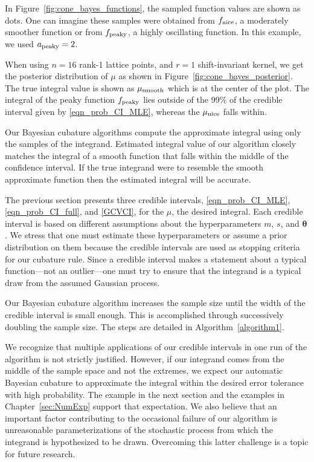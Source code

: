 \documentclass{iitthesis}          %
\newcommand{\bm}[1]{\boldsymbol{#1}}
\newcommand{\vtheta}{{\bm{\theta}}}
\newcommand{\vx}{\bm{x}}
\newcommand{\NICE}{\textup{nice}}
\newcommand{\PEAKY}{\textup{peaky}}
\newcommand{\TRUE}{\textup{smooth}}
\newcommand\figref{Figure~\ref}
\begin{document}
In \figref{fig:cone_bayes_functions}, the sampled function values
are shown as dots. One can imagine these samples %
were obtained from $f_{\NICE}$, a moderately smoother function or from $f_{\PEAKY}$, a highly oscillating function. In this example, we used $a_{\PEAKY} = 2$.

When using $n=16$ rank-1 lattice points, and $r=1$ shift-invariant kernel, we get the posterior distribution of $\mu$ as shown in \figref{fig:cone_bayes_posterior}. The true integral value is shown as $\mu_{\TRUE}$ which is at the center of the plot. The integral of the peaky function $f_{\PEAKY}$ lies outside of the 99\% of the credible interval given by \eqref{eqn_prob_CI_MLE}, whereas the $\mu_{\NICE}$ falls within.

Our Bayesian cubature algorithms compute the approximate integral using only the samples of the integrand. 
Estimated integral value of our algorithm closely matches the integral of a smooth function that falls within the middle of the confidence interval. If the true integrand were to resemble the smooth approximate function then the estimated integral will be accurate.  



\label{sec:bayes_cubature_algo}

The previous section presents three credible intervals, \eqref{eqn_prob_CI_MLE}, \eqref{eqn_prob_CI_full}, and \eqref{GCVCI}, for the $\mu$, the desired integral.  Each credible interval is based on different assumptions about the hyperparameters $m$, $s$, and $\vtheta$.  We stress that one must estimate these hyperparameters or assume a prior distribution on them because the credible intervals are used as stopping criteria for our cubature rule.  Since a credible interval makes a statement about a typical function---not an outlier---one must try to ensure that the integrand is a typical draw from the assumed Gaussian process.

Our  Bayesian cubature algorithm increases the sample size until the width of the credible interval is small enough.  This is accomplished through successively doubling the sample size.  The steps are detailed in Algorithm~\ref{algorithm1}.

We recognize that multiple applications of our credible intervals in one run of the algorithm is not strictly justified.  However, if our integrand comes from the middle of the sample space and not the extremes, we expect our automatic Bayesian cubature to approximate the integral within the desired error tolerance with high probability.  The example in the next section and the examples in Chapter~\ref{sec:NumExp} support that expectation. We also believe that an important factor contributing to the occasional failure of our algorithm is unreasonable parameterizations of the stochastic process from which the integrand is hypothesized to be drawn.  Overcoming this latter challenge is a topic for future research.
\end{document}
